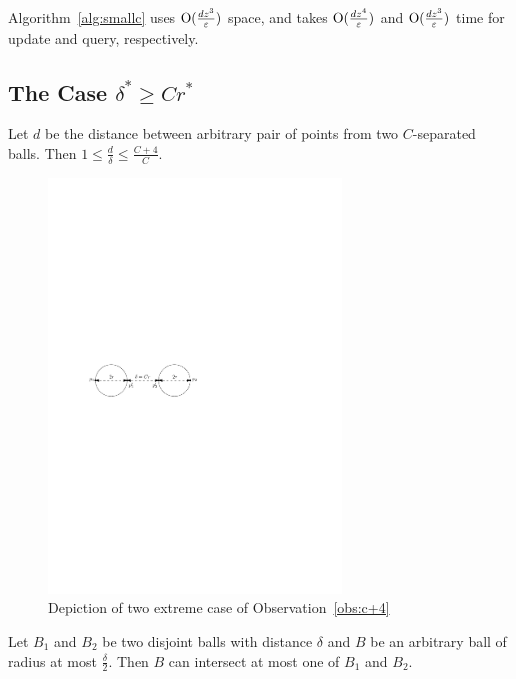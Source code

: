 \documentclass[envcountsame]{cls/cccg15}
\newcommand{\cO}{\ensuremath{{\rm O}}}
\newcommand{\lee}{\leqslant}
\newcommand{\gee}{\geqslant}
\renewcommand{\le}{\lee}
\renewcommand{\ge}{\gee}
\newcommand{\eps}{\varepsilon}
\begin{document}
\begin{theorem}
\label{thm:1st-cmplx}
Algorithm~\ref{alg:smallc} uses $\cO(\frac{dz^3}{\eps})$ space, and takes $\cO(\frac{dz^4}{\eps})$ and $\cO(\frac{dz^3}{\eps})$ time for update and query, respectively.
\end{theorem}

\subsection{The Case $\delta^* \ge C r^*$}
\label{subsec:bigger}


\begin{obs}
\label{obs:c+4}
Let $d$ be the distance between arbitrary pair of points from two $C$-separated balls. Then $1 \le \frac{d}{\delta} \le \frac{C+4}{C}$.
\end{obs}

\begin{figure}[h]
	\centering
	\includegraphics[width=21em]{figs/c_plus_4}
	\caption{Depiction of two extreme case of Observation~\ref{obs:c+4}}
	\label{fig:c+4}
\end{figure}

\begin{obs}
\label{obs:intersection}
Let $B_1$ and $B_2$ be two disjoint balls with distance $\delta$ and $B$ be an arbitrary ball of radius at most $\frac{\delta}{2}$. Then $B$ can intersect at most one of $B_1$ and $B_2$.
\end{obs}
\end{document}
